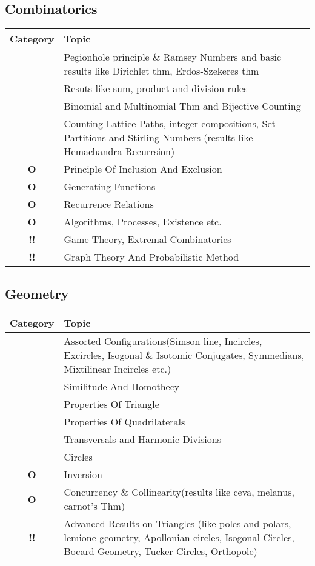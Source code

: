 \documentclass[11pt]{scrartcl}
\providecommand{\isRq}{{\color{green!60!black}\CheckmarkBold}}
\providecommand{\isUs}{{\color{cyan}\sffamily\bfseries O}}
\providecommand{\isAv}{{\color{gray}\sffamily\bfseries !!}}
\begin{document}
  \subsection{Combinatorics}
  \begin{center}
    \begin{tabular}{cp{12cm}}
    \toprule Category & Topic \\ \midrule
    \isRq & Pegionhole principle \& Ramsey Numbers and basic results like Dirichlet thm, Erdos-Szekeres thm\\
    \isRq & Resuts like sum, product and division rules\\
    \isRq & Binomial and Multinomial Thm and Bijective Counting \\
    \isRq & Counting Lattice Paths, integer compositions, Set Partitions and Stirling Numbers (results like Hemachandra Recurrsion)\\
    \isUs & Principle Of Inclusion And Exclusion\\
    \isUs & Generating Functions\\
    \isUs & Recurrence Relations\\
    \isUs & Algorithms, Processes, Existence etc.\\
    \isAv & Game Theory, Extremal Combinatorics\\
    \isAv & Graph Theory And Probabilistic Method\\
    \bottomrule
  \end{tabular}
  \end{center}

  \subsection{Geometry}
  \begin{center}
    \begin{tabular}{cp{12cm}}
    \toprule Category & Topic \\ \midrule
    \isRq & Assorted Configurations(Simson line, Incircles, Excircles, Isogonal \& Isotomic Conjugates, Symmedians, Mixtilinear Incircles etc.)\\
    \isRq & Similitude And Homothecy\\
    \isRq & Properties Of Triangle\\
    \isRq & Properties Of Quadrilaterals\\
    \isRq & Transversals and Harmonic Divisions\\
    \isRq & Circles\\
    \isUs & Inversion\\
    \isUs & Concurrency \& Collinearity(results like ceva, melanus, carnot's Thm)\\
    \isAv & Advanced Results on Triangles (like poles and polars, lemione geometry, Apollonian circles, Isogonal Circles, Bocard Geometry, Tucker Circles, Orthopole)\\
    \bottomrule
  \end{tabular}
  \end{center}
\end{document}
